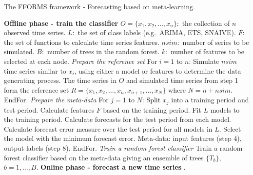 \documentclass[11pt,a4paper,]{article}
\begin{document}
\begin{algorithm}[!ht]
    \centering\footnotesize
    \caption{The FFORMS framework - Forecasting based on meta-learning. }
    \label{alg:algo-lab}
    \begin{algorithmic}[1]
        \Statex \textbf{Offline phase - train the classifier}
        \Statex {}
        \Statex \hspace{1cm}$O=\{x_1, x_2, \dots,x_n\}:$ the collection of $n$ observed time series.
        \Statex \hspace{1cm}$L:$ the set of class labels (e.g.\ ARIMA, ETS, SNAIVE).
        \Statex \hspace{1cm}$F:$ the set of functions to calculate time series features.
        \Statex \hspace{1cm}$\textit{nsim}:$ number of series to be simulated.
        \Statex \hspace{1cm}$B:$ number of trees in the random forest.
        \Statex \hspace{1cm}$k:$ number of features to be selected at each node.
        \Statex {}
        \Statex \hspace{1cm}
        \Statex
        \Statex \textit{Prepare the reference set}
        \State For $i=1$ to $n$:
        \State Simulate $\textit{nsim}$ time series similar to $x_i$, using either a model or features to determine the data generating process.
        \State The time series in $O$ and simulated time series from step 1 form the reference set $R=\{x_1, x_2, \dots,x_n, x_{n+1},\dots,x_N\}$ where $N = n + \textit{nsim}$.
    \State EndFor.
        \Statex
        \Statex \textit{Prepare the meta-data}
        \State For $j=1$ to $N$:
        \State Split $x_j$ into a training period and test period.
        \State Calculate features $F$ based on the training period.
        \State Fit $L$ models to the training period.
        \State Calculate forecasts for the test period from each model.
        \State Calculate forecast error measure over the test period for all models in $L$.
        \State Select the model with the minimum forecast error.
        \State Meta-data: input features (step 4), output labels (step 8).
        \State EndFor.
        \Statex
        \Statex \textit{Train a random forest classifier}
        \State Train a random forest classifier based on the meta-data giving an ensemble of trees $\{T_b\}$, $b=1,\dots,B$.
        \Statex
        \Statex \textbf{Online phase - forecast a new time series}
        \Statex {}
    \Statex \hspace{1cm}.

\end{algorithmic}
\end{algorithm}
\end{document}
